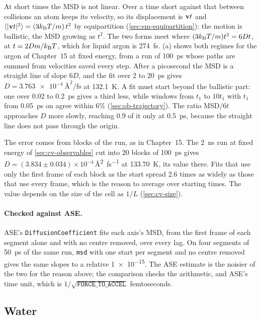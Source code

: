 At short times the MSD is not linear. Over a time short against that
between collisions an atom keeps its velocity, so its displacement is
$\bm{\mathrm{v}}t$ and $\langle \lvert\bm{\mathrm{v}}t\rvert^2 \rangle = (3k_{\mathrm{B}} T/m)\,t^2$ by
equipartition (\cref{sec:sm-equipartition}): the motion is ballistic, the
MSD growing as $t^2$. The two forms meet where $(3k_{\mathrm{B}} T/m)t^2 = 6Dt$, at
$t = 2Dm/k_{\mathrm{B}} T$, which for liquid argon is \SI{274}{\femto\second}.
(a) shows both regimes for the argon of Chapter~15 at
fixed energy, from a run of \SI{100}{\pico\second} whose paths are summed
from velocities saved every step. After a picosecond the MSD is a
straight line of slope $6D$, and the fit over 2 to \SI{20}{\pico\second}
gives $D = \SI{3.763e-4}{\angstrom\squared\per\femto\second}$ at
\SI{132.1}{\kelvin}. A fit must start beyond the ballistic part: one over
0.02 to \SI{0.2}{\pico\second} gives a third less, while windows from
$t_1$ to $10t_1$ with $t_1$ from \SI{0.05}{\pico\second} on agree within
6\% (\cref{sec:ob-trajectory}).
The ratio MSD$/6t$ approaches $D$ more slowly, reaching 0.9 of it only at
\SI{0.5}{\pico\second}, because the straight line does not pass through
the origin.

The error comes from blocks of the run, as in Chapter~15. The
\SI{2}{\nano\second} run at fixed energy of \cref{sec:cv-observables} cut
into 20 blocks of \SI{100}{\pico\second} gives $D = (3.834 \pm
0.034)\times10^{-4}$\,\si{\angstrom\squared\per\femto\second} at
\SI{133.70}{\kelvin}, its value there. Fits that use only the first frame
of each block as the start spread 2.6 times as widely as those that use
every frame, which is the reason to average over starting times. The
value depends on the size of the cell as $1/L$ (\cref{sec:cv-size}).

\paragraph{Checked against ASE.} ASE's \texttt{DiffusionCoefficient}
fits each axis's MSD, from the first frame of each segment alone and
with no centre removed, over every lag. On four segments of
\SI{50}{\pico\second} of the same run, \texttt{msd} with one start per
segment and no centre removed gives the same slopes to a relative
\num{1e-15}. The ASE estimate is the noisier of the two for the reason
above; the comparison checks the arithmetic, and ASE's time unit, which
is $1/\sqrt{\texttt{FORCE\_TO\_ACCEL}}$ femtoseconds.

\subsection*{Water}

